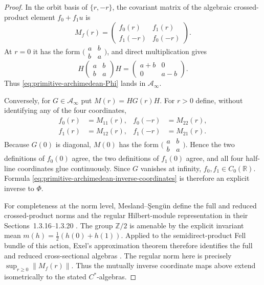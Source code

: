 \begin{proof}
In the orbit basis of $\{r,-r\}$, the covariant matrix of the algebraic
crossed-product element $f_0+f_1u$ is
\[
 M_f(r)=
 \begin{pmatrix}
   f_0(r)&f_1(r)\\
   f_1(-r)&f_0(-r)
 \end{pmatrix}.
\]
At $r=0$ it has the form $\bigl(\begin{smallmatrix}a&b\\b&a\end{smallmatrix}\bigr)$,
and direct multiplication gives
\[
 H\begin{pmatrix}a&b\\b&a\end{pmatrix}H
 =\begin{pmatrix}a+b&0\\0&a-b\end{pmatrix}.
\]
Thus \eqref{eq:primitive-archimedean-Phi} lands in $\mathcal A_\infty$.

Conversely, for $G\in\mathcal A_\infty$ put $M(r)=HG(r)H$.  For $r>0$
define, without identifying any of the four coordinates,
\begin{equation}
 \begin{aligned}
 f_0(r)&=M_{11}(r),& f_0(-r)&=M_{22}(r),\\
 f_1(r)&=M_{12}(r),& f_1(-r)&=M_{21}(r).
 \end{aligned}
 \label{eq:primitive-archimedean-inverse-coordinates}
\end{equation}
Because $G(0)$ is diagonal, $M(0)$ has the form
$\bigl(\begin{smallmatrix}a&b\\b&a\end{smallmatrix}\bigr)$.  Hence the two
definitions of $f_0(0)$ agree, the two definitions of $f_1(0)$ agree, and all
four half-line coordinates glue continuously.  Since $G$ vanishes at
infinity, $f_0,f_1\in C_0(\mathbb R)$.  Formula
\eqref{eq:primitive-archimedean-inverse-coordinates} is therefore an explicit
inverse to $\Phi$.

For completeness at the norm level, Mesland--\c Seng\"un define the full and
reduced crossed-product norms and the regular Hilbert-module representation
in their Sections~1.3.16--1.3.20
\cite[pp.~12--13]{meslandSengun2025}.  The group $\mathbb Z/2$ is amenable by
the explicit invariant mean $m(h)=\frac12(h(0)+h(1))$.  Applied to the
semidirect-product Fell bundle of this action, Exel's approximation theorem
therefore identifies the full and reduced cross-sectional algebras
\cite[Theorems~20.6--20.7, pp.~148--149]{exel2017}.  The regular norm here is
precisely $\sup_{r\geq0}\|M_f(r)\|$.  Thus the mutually inverse coordinate maps
above extend isometrically to the stated $C^*$-algebras.


\end{proof}
